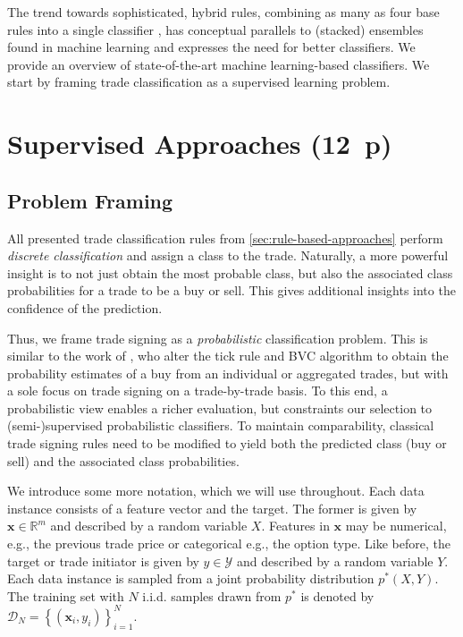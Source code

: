 The trend towards sophisticated, hybrid rules, combining as many as four base rules into a single classifier \autocite[cp.][18]{grauerOptionTradeClassification2022}, has conceptual parallels to (stacked) ensembles found in machine learning and expresses the need for better classifiers. We provide an overview of state-of-the-art machine learning-based classifiers. We start by framing trade classification as a supervised learning 
problem.


\newpage
{}
\section{Supervised Approaches (12~p)}\label{sec:supervised-approaches}
\subsection{Problem Framing}\label{sec:problem-framing}

All presented trade classification rules from \cref{sec:rule-based-approaches}  perform \emph{discrete classification} and assign a class to the trade. Naturally, a more powerful insight is to not just obtain the most probable class, but also the associated class probabilities for a trade to be a buy or sell. This gives additional insights into the confidence of the prediction.

Thus, we frame trade signing as a \emph{probabilistic} classification problem. This is similar to the work of \textcite[][272]{easleyDiscerningInformationTrade2016}, who alter the tick rule and \gls{BVC} algorithm to obtain the probability estimates of a buy from an individual or aggregated trades, but with a sole focus on trade signing on a trade-by-trade basis. To this end, a probabilistic view enables a richer evaluation, but constraints our selection to (semi-)supervised probabilistic classifiers. To maintain comparability, classical trade signing rules need to be modified to yield both the predicted class (buy or sell) and the associated class probabilities.

We introduce some more notation, which we will use throughout. Each data instance consists of a feature vector and the target. The former is given by $\boldsymbol{x} \in \mathbb{R}^m$ and described by a random variable $X$. Features in $\boldsymbol{x}$ may be numerical, e.g., the previous trade price or categorical e.g., the option type. Like before, the target or trade initiator is given by $y \in \mathcal{Y}$ and described by a random variable $Y$. Each data instance is sampled from a joint probability distribution $p^*(X, Y)$. The training set with $N$ i.i.d. samples drawn from $p^*$ is denoted by $\mathcal{D}_N=\left\{\left(\boldsymbol{x}_i, y_i\right)\right\}_{i=1}^N$.

